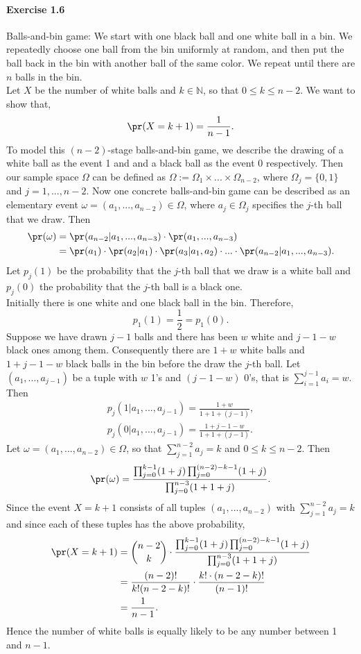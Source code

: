 \paragraph{Exercise 1.6} Balls-and-bin game: We start with one black ball and one
white ball in a bin. We repeatedly choose one ball from the bin uniformly at
random, and then put the ball back in the bin with another ball of the same color.
We repeat until there are $n$ balls in the bin. \\[0,2cm]
Let $X$ be the number of white balls and $k \in \mathbb{N}$, so that $0 \leq k
\leq n-2$. We want to show that,
\[ \pr(X=k+1) = \frac{1}{n-1}. \]
To model this $(n-2)$-stage balls-and-bin game, we describe the drawing of a white
ball as the event 1 and and a black ball as the event 0 respectively. Then our
sample space $\Omega$ can be defined as $\Omega := \Omega_1 \times ... \times
\Omega_{n-2}$, where $\Omega_j = \{ 0, 1\}$ and $j = 1,...,n-2$. Now one concrete
balls-and-bin game can be described as an elementary event $\omega =
(a_1,...,a_{n-2}) \in \Omega$, where $a_j \in \Omega_j$ specifies the $j$-th ball
that we draw. Then
\begin{align*}
  \pr(\omega)
    &= \pr(a_{n-2}| a_1,...,a_{n-3}) \cdot \pr(a_1,...,a_{n-3}) \\
    &= \pr(a_1) \cdot \pr(a_2| a_1) \cdot \pr(a_3| a_1,a_2) \cdot ... \cdot \pr(a_{n-2}| a_1,...,a_{n-3}).
\end{align*}
Let $p_j(1)$ be the probability that the $j$-th ball that we draw is
a white ball and $p_j(0)$ the probability that the $j$-th ball is a black one. \\
Initially there is one white and one black ball in the bin. Therefore,
\[ p_1(1) = \frac{1}{2} = p_1(0). \]
Suppose we have drawn $j-1$ balls and there has been $w$ white and $j-1-w$ black
ones among them. Consequently there are $1 + w$ white balls and $1 + j - 1 - w$
black balls in the bin before the draw the $j$-th ball. Let
$\left(a_1,...,a_{j-1}\right)$ be a tuple with $w$ 1's and $(j-1-w)$ 0's, that is
$\sum_{i=1}^{j-1}a_i = w$. Then
\begin{align*}
    p_j(1|a_1,...,a_{j-1}) = \frac{1 + w}{1 + 1 + (j-1)}, \\
    p_j(0|a_1,...,a_{j-1}) = \frac{1+j-1-w}{1 + 1 + (j-1)}.
\end{align*}
Let $\omega = (a_1, ..., a_{n-2}) \in \Omega$, so that $\sum_{j=1}^{n-2}a_j = k$
and $0 \leq k \leq n-2$. Then
\[
  \pr(\omega) = \frac {\prod_{j=0}^{k-1}(1 + j) \prod_{j=0}^{(n-2)-k-1}(1 + j)}
                      {\prod_{j=0}^{n-3}(1+1+j)}.
\]
Since the event $X=k+1$ consists of all tuples $(a_1,...,a_{n-2})$ with
$\sum_{j=1}^{n-2}a_j = k$ and since each of these tuples has the above probability,
\begin{align*}
  \pr(X=k+1)
    &= \binom{n-2}{k} \cdot \frac {\prod_{j=0}^{k-1}(1 + j) \prod_{j=0}^{(n-2)-k-1}(1 + j)}{\prod_{j=0}^{n-3}(1+1+j)} \\
    &= \frac{(n-2)!}{k! (n-2-k)!} \cdot \frac{k! \cdot (n-2-k)!}{(n-1)!} \\
    &= \frac{1}{n-1}.
\end{align*}
Hence the number of white balls is equally likely to be any number between 1 and
$n-1$.

